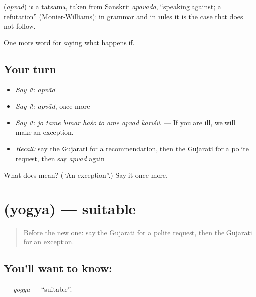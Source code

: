 \begin{cousinweb}
\textbf{} (\emph{apvād}) is a tatsama, taken from Sanskrit \emph{apavāda}, \textquotedblleft{}speaking against; a refutation\textquotedblright{} (Monier-Williams); in grammar and in rules it is the case that does not follow.
\end{cousinweb}

\begin{grammarlens}[title={What you've built}]
One more word for saying what happens if.
\end{grammarlens}

\subsection*{Your turn}
\begin{itemize}
\raggedright
  \item \emph{Say it:} \emph{apvād}
  \item \emph{Say it:} \emph{apvād}, once more
  \item \emph{Say it:} \emph{jo tame bīmār haśo to ame apvād karīśũ.} — If you are ill, we will make an exception.
  \item \emph{Recall:} say the Gujarati for a recommendation, then the Gujarati for a polite request, then say \emph{apvād} again
\end{itemize}

\begin{tcolorbox}[breakable,colback=teal!4,colframe=teal!35!black,title={Before you move on}]
What does  mean? (\textquotedblleft{}An exception\textquotedblright{}.) Say it once more.
\end{tcolorbox}
\section[\texorpdfstring{\gu{યોગ્ય} (yogya)}{યોગ્ય (yogya)}]{ (yogya) — suitable}

\label{lesson:GU-C543-yogya}



\begin{quote}
Before the new one: say the Gujarati for a polite request, then the Gujarati for an exception.
\end{quote}

\subsection*{You'll want to know: }
\textbf{} — \emph{yogya} — \textquotedblleft{}suitable\textquotedblright{}.


